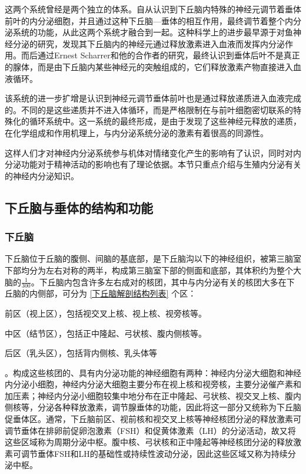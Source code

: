 这两个系统曾经是两个独立的体系。自从认识到下丘脑内特殊的神经元调节着垂体前叶的内分泌细胞，并且通过这种下丘脑---垂体的相互作用，最终调节着整个内分泌系统的功能，从此这两个系统才融合到一起。这种科学上的进步最早源于对鱼神经分泌的研究，发现其下丘脑内的神经元通过释放激素进入血液而发挥内分泌作用。而后通过Ernest Scharrer和他的合作者的研究，最终认识到垂体后叶不是真正的腺体，而是由下丘脑内某些神经元的突触组成的，它们释放激素产物直接进入血液循环。

该系统的进一步扩增是认识到神经元调节垂体前叶也是通过释放递质进入血液完成的。不同的是这些递质并不进入体循环，而是严格限制在与前叶细胞密切联系的特殊化的循环系统中。这一系统的最终形成，是由于发现了这些神经元释放的递质，在化学组成和作用机理上，与内分泌系统分泌的激素有着很高的同源性。

这样人们才对神经内分泌系统参与机体对情绪变化产生的影响有了认识，同时对内分泌功能对于精神活动的影响也有了理论依据。本节只重点介绍与生殖内分泌有关的神经内分泌知识。

\subsection{下丘脑与垂体的结构和功能}

\subsubsection{下丘脑}

下丘脑位于丘脑的腹侧、间脑的基底部，是下丘脑沟以下的神经组织，被第三脑室下部均分为左右对称的两半，构成第三脑室下部的侧面和底部，其体积约为整个大脑的$ \frac{1}{300} $。下丘脑内包含许多左右成对的核团，其中与内分泌有关的核团大多在下丘脑的内侧部，可分为 \ref{下丘脑解剖结构列表} 个区：\begin{inparaenum}\item 前区（视上区），包括视交叉上核、视上核、视旁核等。\item 中区（结节区），包括正中隆起、弓状核、腹内侧核等。\item 后区（乳头区），包括背内侧核、乳头体等\label{下丘脑解剖结构列表}\end{inparaenum}。构成这些核团的、具有内分泌功能的神经细胞有两种：神经内分泌大细胞和神经内分泌小细胞，神经内分泌大细胞主要分布在视上核和视旁核，主要分泌催产素和加压素；神经内分泌小细胞较集中地分布在正中隆起、弓状核、视交叉上核、腹内侧核等，分泌各种释放激素，调节腺垂体的功能，因此将这一部分又统称为下丘脑促垂体区。通常，下丘脑前区、视前核和视交叉上核等神经核团分泌的释放激素可调节垂体在排卵前促卵泡激素（FSH）和促黄体激素（LH）的分泌活动，故又将这些区域称为周期分泌中枢。腹中核、弓状核和正中隆起等神经核团分泌的释放激素可调节垂体FSH和LH的基础性或持续性波动分泌，因此这些区域又称为持续分泌中枢。

